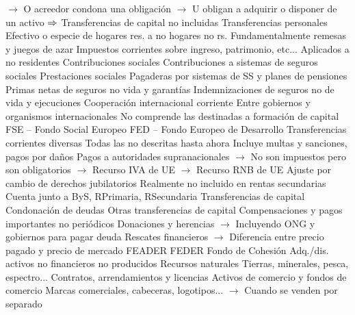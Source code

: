 \documentclass{nuevotema}
\begin{document}
\begin{esquemal}
				\4[] $\to$ O acreedor condona una obligación
				\4[] $\to$ U obligan a adquirir o disponer de un activo
				\4[] $\Rightarrow$ Transferencias de capital no incluidas
			\3 Transferencias personales
				\4[] Efectivo o especie de hogares res. a no hogares no rs.
				\4[] Fundamentalmente remesas y juegos de azar
			\3 Impuestos corrientes sobre ingreso, patrimonio, etc...
				\4[] Aplicados a no residentes
			\3 Contribuciones sociales
				\4[] Contribuciones a sistemas de seguros sociales
			\3 Prestaciones sociales
				\4[] Pagaderas por sistemas de SS y planes de pensiones
			\3 Primas netas de seguros no vida y garantías
			\3 Indemnizaciones de seguros no de vida y ejecuciones
			\3 Cooperación internacional corriente
				\4[] Entre gobiernos y organismos internacionales
				\4[] No comprende las destinadas a formación de capital
				\4[] FSE -- Fondo Social Europeo
				\4[] FED -- Fondo Europeo de Desarrollo
			\3 Transferencias corrientes diversas
				\4[] Todas las no descritas hasta ahora
				\4[] Incluye multas y sanciones, pagos por daños
				\4[] Pagos a autoridades supranacionales
				\4[] $\to$ No son impuestos pero son obligatorios
				\4[] $\to$ Recurso IVA de UE
				\4[] $\to$ Recurso RNB de UE
			\3 Ajuste por cambio de derechos jubilatorios
				\4[] Realmente no incluido en rentas secundarias
				\4[] Cuenta junto a ByS, RPrimaria, RSecundaria
	\1 
		\2 Transferencias de capital
			\3 Condonación de deudas
			\3 Otras transferencias de capital
				\4[] Compensaciones y pagos importantes no periódicos
				\4[] Donaciones y herencias
				\4[] $\to$ Incluyendo ONG y gobiernos para pagar deuda
				\4[] Rescates financieros
				\4[] $\to$ Diferencia entre precio pagado y precio de mercado
				\4[] FEADER
				\4[] FEDER
				\4[] Fondo de Cohesión
		\2 Adq./dis. activos no financieros no producidos
			\3 Recursos naturales
				\4[] Tierras, minerales, pesca, espectro...
			\3 Contratos, arrendamientos y licencias
			\3 Activos de comercio y fondos de comercio
				\4[] Marcas comerciales, cabeceras, logotipos...
				\4[] $\to$ Cuando se venden por separado
	\1 


\end{esquemal}
\end{document}
